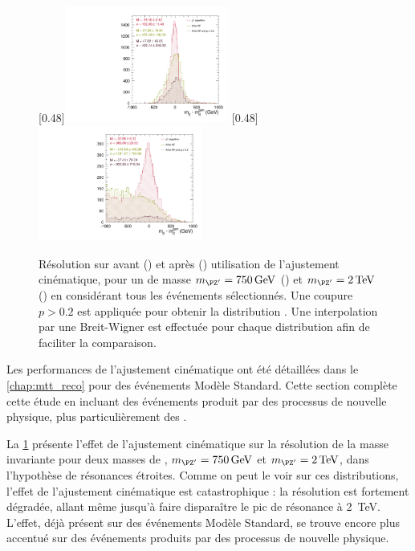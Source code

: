 \begin{figure}[tbp] \centering
    \subcaptionbox{\label{fig:kf_zp_750}}[0.48\textwidth]{\includegraphics[width=0.48\textwidth,angle=-90,origin=c]{chapitre7/figs/kinfit/mtt_resolution_comparison_kf_zp750_all_events.pdf}} \hfill
    \subcaptionbox{\label{fig:kf_zp_2000}}[0.48\textwidth]{\includegraphics[width=0.48\textwidth,angle=-90,origin=c]{chapitre7/figs/kinfit/mtt_resolution_comparison_kf_zp2000_all_events.pdf}}
    \caption{Résolution sur \mtt avant (\rouge) et après (\vertc) utilisation de l'ajustement cinématique, pour un \zprime de masse $\mzp = \SI{750}{\GeV}$ () et $\mzp = \SI{2}{\TeV}$ () en considérant tous les événements sélectionnés. Une coupure $p > \num{0.2}$ est appliquée pour obtenir la distribution \violette. Une interpolation par une Breit-Wigner est effectuée pour chaque distribution afin de faciliter la comparaison.}
    \label{fig:kf_zp}
\end{figure}

Les performances de l'ajustement cinématique ont été détaillées dans le \cref{chap:mtt_reco} pour des événements \ttbar Modèle Standard. Cette section complète cette étude en incluant des événements \ttbar produit par des processus de nouvelle physique, plus particulièrement des \zprime.

\medskip

La \cref{fig:kf_zp} présente l'effet de l'ajustement cinématique sur la résolution de la masse invariante pour deux masses de \zprime, $\mzp = \SI{750}{\GeV}$ et $\mzp = \SI{2}{\TeV}$, dans l'hypothèse de résonances étroites. Comme on peut le voir sur ces distributions, l'effet de l'ajustement cinématique est catastrophique : la résolution est fortement dégradée, allant même jusqu'à faire disparaître le pic de résonance à \SI{2}{\TeV}. L'effet, déjà présent sur des événements \ttbar Modèle Standard, se trouve encore plus accentué sur des événements \ttbar produits par des processus de nouvelle physique.

